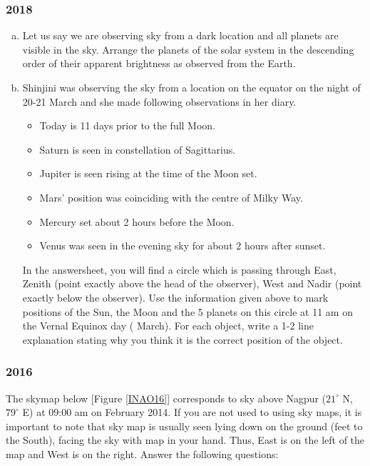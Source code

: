 \documentclass[a4paper,12pt]{extarticle}
\begin{document}
\subsubsection{2018}

\begin{enumerate}[a.]
    \item Let us say we are observing sky from a dark location and all planets are visible in the sky. Arrange the planets of the solar system in the descending order of their apparent brightness as observed from the Earth.
    \item Shinjini was observing the sky from a location on the equator on the night of 20-21 March and she made following observations in her diary.
    \begin{itemize}
        \item Today is 11 days prior to the full Moon.
        \item Saturn is seen in constellation of Sagittarius.
        \item Jupiter is seen rising at the time of the Moon set.
        \item Mars’ position was coinciding with the centre of Milky Way.
        \item Mercury set about 2 hours before the Moon.
        \item Venus was seen in the evening sky for about 2 hours after sunset.
    \end{itemize}
In the answersheet, you will find a circle which is passing through East, Zenith (point exactly above the head of the observer), West and Nadir (point exactly below the observer). Use the information given above to mark positions of the Sun, the Moon and the 5 planets on this circle at 11 am on the Vernal Equinox day ( March). For each object, write a 1-2 line explanation stating why you think it is the correct position of the object.
\end{enumerate}


\subsubsection{2016}

The skymap below [Figure \ref{INAO16}] corresponds to sky above Nagpur ($21^\circ$ N, $79^\circ$ E) at 09:00 am on  February 2014. If you are not used to using sky maps, it is important to note that sky map is usually seen lying down on the ground (feet to the South), facing the sky with map in your hand. Thus, East is on the left of the map and West is on the right. Answer the following questions:\\
\end{document}
